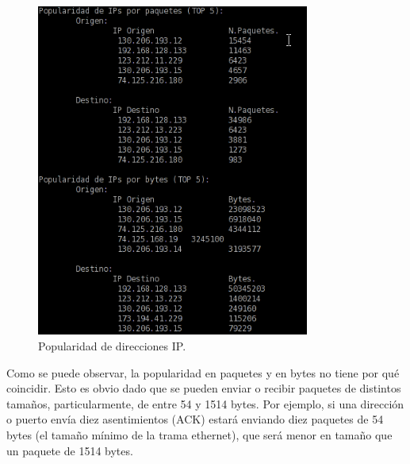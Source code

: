 \documentclass[a4paper, 11pt]{article}	%
\begin{document}
\begin{figure}[H]
\centering
\includegraphics[width=0.8\textwidth]{popularidadIP.png}
\caption{Popularidad de direcciones IP.}
\label{fig:popIP}
\end{figure}

Como se puede observar, la popularidad en paquetes y en bytes no tiene por qué coincidir. Esto es obvio dado que se pueden enviar o recibir paquetes de distintos tamaños, particularmente, de entre 54 y 1514 bytes. Por ejemplo, si una dirección o puerto envía diez asentimientos (ACK) estará enviando diez paquetes de 54 bytes (el tamaño mínimo de la trama ethernet), que será menor en tamaño que un paquete de 1514 bytes.
\end{document}
